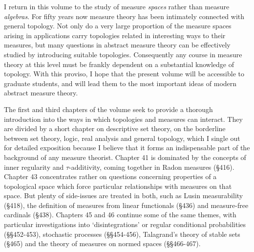 
\def\volumename{Topological Measure Spaces}


I return in this volume to the study of measure {\it spaces} rather than
measure {\it algebras}.   For fifty years now measure theory has been
intimately connected with general topology.   Not only do a very large
proportion of the measure spaces arising in applications carry
topologies related in interesting ways to their measures, but many
questions in abstract measure theory can be effectively studied by
introducing suitable topologies.   Consequently any course in measure
theory at this level must be frankly dependent on a substantial
knowledge of topology.   With this proviso, I hope that the present
volume will be accessible to graduate students, and will lead them to
the most important ideas of modern abstract measure theory.

The first and third chapters of the volume seek to provide a thorough
introduction into the ways in which topologies and measures can
interact.   They are divided by a short chapter on descriptive set
theory, on the borderline between set theory, logic, real analysis and
general topology, which I single out for detailed exposition because I
believe that it forms an indispensable part of the background of any
measure theorist.   Chapter 41 is dominated by the concepts of inner
regularity and $\tau$-additivity, coming together in Radon measures
(\S416).   Chapter 43 concentrates rather on questions concerning
properties of a
topological space which force particular relationships with measures on
that space.   But plenty of side-issues are treated in both, such as
Lusin measurability (\S418), the definition of measures from linear
functionals (\S436) and
measure-free cardinals (\S438).   Chapters 45 and 46 continue some of
the same themes, with particular investigations into `disintegrations'
or regular conditional probabilities (\S\S452-453),
stochastic processes (\S\S454-456), %
Talagrand's theory of
stable sets (\S465) and the theory of measures on normed
spaces (\S\S466-467).

